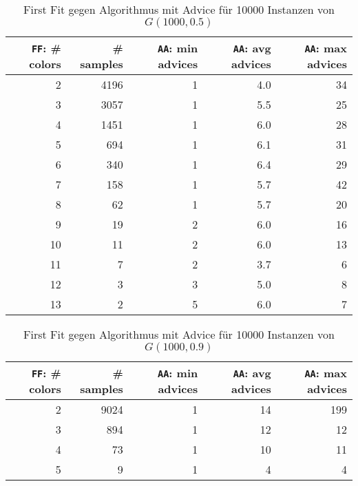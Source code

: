\documentclass[11pt,abstracton]{scrreprt} %
\theoremstyle{definition}
\begin{document}
\begin{table}
\caption{First Fit gegen Algorithmus mit Advice für 10000 Instanzen von $G(1000, 0.5)$}
\label{tab.exp1p05}
  \centering
    \begin{tabular}{rrrrr}
    \toprule
    {\tt{FF}}: \# colors & \# samples & {\tt{AA}}: min advices & {\tt{AA}}: avg advices & {\tt{AA}}: max advices \\
    \midrule
2     & 4196  & 1     & 4.0 & 34 \\
3     & 3057  & 1     & 5.5 & 25 \\
4     & 1451  & 1     & 6.0 & 28 \\
5     & 694   & 1     & 6.1 & 31 \\
6     & 340   & 1     & 6.4 & 29 \\
7     & 158   & 1     & 5.7 & 42 \\
8     & 62    & 1     & 5.7 & 20 \\
9     & 19    & 2     & 6.0     & 16 \\
10    & 11    & 2     & 6.0     & 13 \\
11    & 7     & 2     & 3.7 & 6 \\
12    & 3     & 3     & 5.0     & 8 \\
13    & 2     & 5     & 6.0     & 7 \\

    \bottomrule
    \end{tabular}%

\end{table}

\begin{table}
\caption{First Fit gegen Algorithmus mit Advice für 10000 Instanzen von $G(1000, 0.9)$}
\label{tab.exp1p09}
  \centering
\begin{tabular}{rrrrr}
\toprule
    {\tt{FF}}: \# colors & \# samples & {\tt{AA}}: min advices & {\tt{AA}}: avg advices & {\tt{AA}}: max advices \\
\midrule
2     & 9024  & 1     & 14    & 199 \\
3     & 894   & 1     & 12    & 12 \\
4     & 73    & 1     & 10    & 11 \\
5     & 9     & 1     & 4     & 4 \\
\bottomrule
\end{tabular}%


\end{table}
\end{document}
